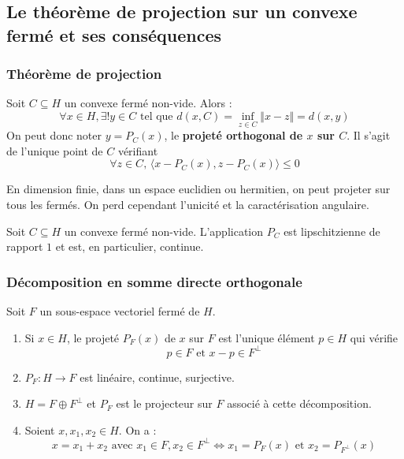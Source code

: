   \subsection{Le théorème de projection sur un convexe fermé et ses conséquences}

  \subsubsection{Théorème de projection}


  \begin{theorem}
    Soit $C \subseteq H$ un convexe fermé non-vide. Alors :
    \[ \forall x \in H, \exists! y \in C \text{ tel que } d(x, C) = \inf_{z \in C} \Vert x - z \Vert = d(x, y) \]
    On peut donc noter $y = P_C(x)$, le \textbf{projeté orthogonal de $x$ sur $C$}. Il s'agit de l'unique point de $C$ vérifiant
    \[ \forall z \in C, \, \langle x - P_C(x), z - P_C(x) \rangle \leq 0 \tag{$*$} \]
  \end{theorem}


  \begin{remark}
    En dimension finie, dans un espace euclidien ou hermitien, on peut projeter sur tous les fermés. On perd cependant l'unicité et la caractérisation angulaire.
  \end{remark}

  \begin{proposition}
    Soit $C \subseteq H$ un convexe fermé non-vide. L'application $P_C$ est lipschitzienne de rapport $1$ et est, en particulier, continue.
  \end{proposition}

  \subsubsection{Décomposition en somme directe orthogonale}

  \begin{theorem}
    Soit $F$ un sous-espace vectoriel fermé de $H$.
    \begin{enumerate}[label={\bfseries(\roman*)}]
      \item Si $x \in H$, le projeté $P_F(x)$ de $x$ sur $F$ est l'unique élément $p \in H$ qui vérifie
      \[ p \in F \text{ et } x - p \in F^\perp \]
      \item $P_F : H \rightarrow F$ est linéaire, continue, surjective.
      \item $H = F \oplus F^\perp$ et $P_F$ est le projecteur sur $F$ associé à cette décomposition.
      \item Soient $x, x_1, x_2 \in H$. On a :
      \[ x = x_1 + x_2 \text{ avec } x_1 \in F, x_2 \in F^\perp \iff x_1 = P_F(x) \text{ et } x_2 = P_{F^\perp}(x) \]
    \end{enumerate}
  \end{theorem}

